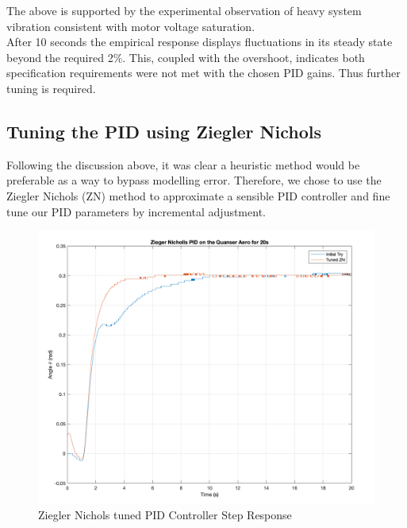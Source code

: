 \documentclass[11pt]{article}
\begin{document}
The above is supported by the experimental observation of heavy system vibration consistent with motor voltage saturation.\\
 
After 10 seconds the empirical response displays fluctuations in its steady state beyond the required 2\%. This, coupled with the overshoot, indicates both specification requirements were not met with the chosen PID gains. Thus further tuning is required.

\newpage
\subsection{Tuning the PID using Ziegler Nichols}
Following the discussion above, it was clear a heuristic method would be preferable as a way to bypass modelling error.
Therefore, we chose to use the Ziegler Nichols (ZN) method to approximate a sensible PID controller and fine tune our PID
parameters by incremental adjustment.\\

\begin{figure}[ht!]
    \centering
    \includegraphics[scale=0.45]{W2ZNStep.png}
    \caption{Ziegler Nichols tuned PID Controller Step Response}
    \label{fig:W2ZNStep}
\end{figure}
\end{document}
